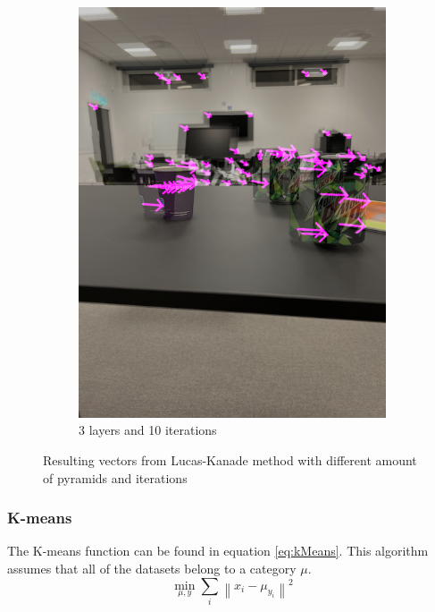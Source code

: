 \documentclass{article}
\newcommand\norm[1]{\left\lVert#1\right\rVert}
\begin{document}
\begin{figure}[H]
\begin{subfigure}{0.48\textwidth}
            \includegraphics[width=1\textwidth]{3levels-10iterations.png}
            \caption{3 layers and 10 iterations}
            \label{fig:sub:flow}
        \end{subfigure}   
        \caption{Resulting vectors from Lucas-Kanade method with different amount of pyramids and iterations}
        \label{fig:flow-vectors}
    \end{figure}

    \subsubsection{K-means}
    The K-means function can be found in equation \ref{eq:kMeans}. This algorithm assumes that all of the datasets belong to a category $\mu$.
    \begin{equation}
        \label{eq:kMeans}
        \min_{\mu, y} \sum_i \norm{x_i - \mu_{y_i}}^2
    \end{equation}
\end{document}

